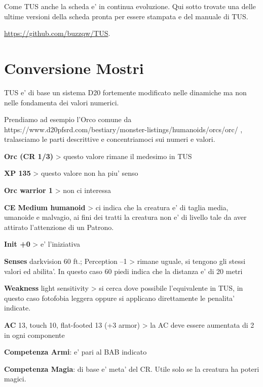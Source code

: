 \documentclass[a4paper,11pt,twoside,openany]{book}
\begin{document}
Come TUS anche la scheda e' in continua evoluzione. Qui sotto trovate una delle ultime versioni della scheda pronta per essere stampata e del manuale di TUS. 

\url{https://github.com/buzzqw/TUS}.





\pagebreak

\section*{Conversione Mostri}

\bigskip

TUS e' di base un sistema D20 fortemente modificato nelle dinamiche ma non nelle fondamenta dei valori numerici.

Prendiamo ad esempio l'Orco comune da https://www.d20pfsrd.com/bestiary/monster-listings/humanoids/orcs/orc/ , tralasciamo le parti descrittive e concentriamoci sui numeri e valori.

\bigskip

\textbf{Orc (CR 1/3)} \textgreater{} questo valore rimane il medesimo in TUS

\textbf{XP 135} \textgreater{} questo valore non ha piu' senso 

\textbf{Orc warrior 1} \textgreater{} non ci interessa

\textbf{CE Medium humanoid} \textgreater{} ci indica che la creatura e' di taglia media, umanoide e malvagio, ai fini dei tratti la creatura non e' di livello tale da aver attirato l'attenzione di un Patrono.

\textbf{Init +0} \textgreater{} e' l'iniziativa

\textbf{Senses} darkvision 60 ft.; Perception --1 \textgreater{} rimane uguale, si tengono gli stessi valori ed abilita'. In questo caso 60 piedi indica che la distanza e' di 20 metri

\textbf{Weakness} light sensitivity \textgreater{} si cerca dove possibile l'equivalente in TUS, in questo caso fotofobia leggera oppure si applicano direttamente le penalita' indicate.

\textbf{AC} 13, touch 10, flat-footed 13 (+3 armor) \textgreater{} la AC deve essere aumentata di 2 in ogni componente

\textbf{Competenza Armi}: e' pari al BAB indicato

\textbf{Competenza Magia}: di base e' meta' del CR. Utile solo se la creatura ha poteri magici.
\end{document}
